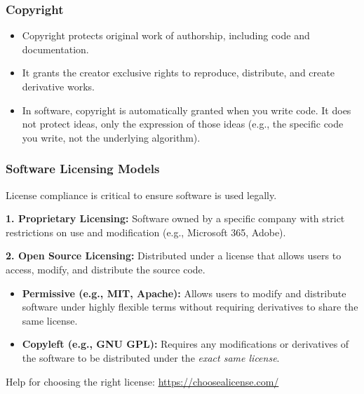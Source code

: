 \documentclass[xcolor=table]{beamer}
\begin{document}
\begin{frame}
    \frametitle{Copyright}
    \small
    \begin{itemize}
        \item Copyright protects original work of authorship, including code and documentation.
        \item It grants the creator exclusive rights to reproduce, distribute, and create derivative works.
        \item In software, copyright is automatically granted when you write code. It does not protect ideas, only the expression of those ideas (e.g., the specific code you write, not the underlying algorithm).
    \end{itemize}
\end{frame}

\begin{frame}
    \frametitle{Software Licensing Models}
    \small
    License compliance is critical to ensure software is used legally.
    
    \vspace{0.2cm}
    \textbf{1. Proprietary Licensing:} Software owned by a specific company with strict restrictions on use and modification (e.g., Microsoft 365, Adobe).
    
    \vspace{0.2cm}
    \textbf{2. Open Source Licensing:} Distributed under a license that allows users to access, modify, and distribute the source code.
    \begin{itemize}
        \item \textbf{Permissive (e.g., MIT, Apache):} Allows users to modify and distribute software under highly flexible terms without requiring derivatives to share the same license.
        \item \textbf{Copyleft (e.g., GNU GPL):} Requires any modifications or derivatives of the software to be distributed under the \textit{exact same license}.
    \end{itemize}

    Help for choosing the right license: \url{https://choosealicense.com/}
\end{frame}
\end{document}
